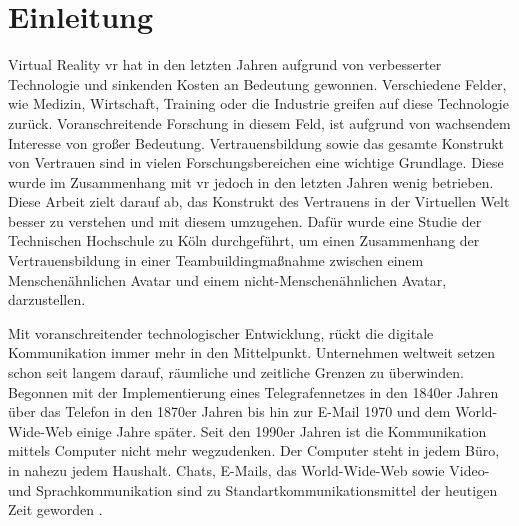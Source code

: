 \documentclass[a4paper,11pt]{article}%
\renewcommand{\\}{\vspace*{0.5\baselineskip} \newline}
\begin{document}


\section*{Einleitung}

Virtual Reality \ac{vr} hat in den letzten Jahren aufgrund von verbesserter Technologie und sinkenden Kosten an Bedeutung gewonnen. Verschiedene Felder, wie Medizin, Wirtschaft, Training oder die Industrie greifen auf diese Technologie zurück. Voranschreitende Forschung in diesem Feld, ist aufgrund von wachsendem Interesse von großer Bedeutung. Vertrauensbildung sowie das gesamte Konstrukt von Vertrauen sind in vielen Forschungsbereichen eine wichtige Grundlage. Diese wurde im Zusammenhang mit \ac{vr} jedoch in den letzten Jahren wenig betrieben. Diese Arbeit zielt darauf ab, das Konstrukt des Vertrauens in der Virtuellen Welt besser zu verstehen und mit diesem umzugehen. Dafür wurde eine Studie der Technischen Hochschule zu Köln durchgeführt, um einen Zusammenhang der Vertrauensbildung in einer Teambuildingmaßnahme zwischen einem Menschenähnlichen Avatar und einem nicht-Menschenähnlichen Avatar, darzustellen.

	Mit voranschreitender technologischer Entwicklung, rückt die digitale Kommunikation immer mehr in den Mittelpunkt. Unternehmen weltweit setzen schon seit langem darauf, räumliche und zeitliche Grenzen zu überwinden. Begonnen mit der Implementierung eines Telegrafennetzes in den 1840er Jahren über das Telefon in den 1870er Jahren bis hin zur E-Mail 1970 und dem World-Wide-Web einige Jahre später.
	Seit den 1990er Jahren ist die Kommunikation mittels Computer nicht mehr wegzudenken. Der Computer steht in jedem Büro, in nahezu jedem Haushalt. Chats, E-Mails, das World-Wide-Web sowie Video- und Sprachkommunikation sind zu Standartkommunikationsmittel der heutigen Zeit geworden \citep[p. 14-16]{thurlow2004computer}.
	
\end{document}
